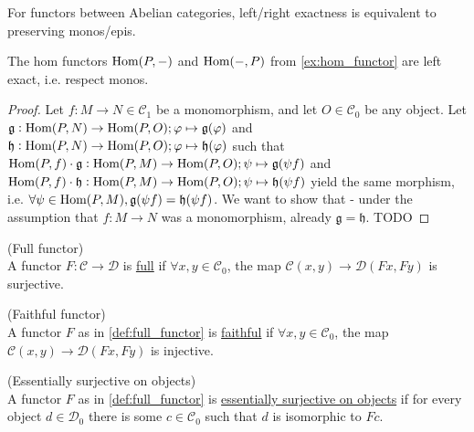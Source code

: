 \begin{lemma}
For functors between Abelian categories, left/right exactness is equivalent to preserving monos/epis.
\end{lemma}

\begin{lemma}\label{la:hom_functor_left_exact}
The hom functors $\textup{Hom}(P,-)$ and $\textup{Hom}(-,P)$ from \ref{ex:hom_functor} are left exact, i.e. respect monos.
\begin{proof}
Let $f : M \rightarrow N \in \mathcal{C}_{1}$ be a monomorphism, and let $O \in \mathcal{C}_{0}$ be any object.
Let $\mathfrak{g} : \textup{Hom}(P,N) \rightarrow \textup{Hom}(P,O); \varphi \mapsto \mathfrak{g}(\varphi)$
and $\mathfrak{h} : \textup{Hom}(P,N) \rightarrow \textup{Hom}(P,O); \varphi \mapsto \mathfrak{h}(\varphi)$
such that $\textup{Hom}(P,f) \cdot \mathfrak{g} : \textup{Hom}(P,M) \rightarrow \textup{Hom}(P,O); \psi \mapsto \mathfrak{g}(\psi f)$
and  $\textup{Hom}(P,f) \cdot \mathfrak{h} : \textup{Hom}(P,M) \rightarrow \textup{Hom}(P,O); \psi \mapsto \mathfrak{h}(\psi f)$
yield the same morphism, i.e. $\forall \psi \in \textup{Hom}(P,M), \mathfrak{g}(\psi f) = \mathfrak{h}(\psi f)$.
We want to show that - under the assumption that $f : M \rightarrow N$ was a monomorphism, already $\mathfrak{g} = \mathfrak{h}$.
TODO
\end{proof}
\end{lemma}

\begin{definition}{(Full functor)}\label{def:full_functor}\\
A functor $F : \mathcal{C} \rightarrow \mathcal{D}$ is \ul{full} if
$\forall x, y \in \mathcal{C}_{0}$, the map $\mathcal{C}(x, y) \rightarrow \mathcal{D}(Fx, Fy)$ is surjective.
\end{definition}

\begin{definition}{(Faithful functor)}\label{def:faithful_functor}\\
A functor $F$ as in \ref{def:full_functor} is \ul{faithful} if
$\forall x, y \in \mathcal{C}_{0}$, the map $\mathcal{C}(x, y) \rightarrow \mathcal{D}(Fx, Fy)$ is injective.
\end{definition}

\begin{definition}{(Essentially surjective on objects)}\label{def:ess_surj_o_o}\\
A functor $F$ as in \ref{def:full_functor} is \ul{essentially surjective on objects} if for every object $d \in \mathcal{D}_{0}$ there
is some $c \in \mathcal{C}_{0}$ such that $d$ is isomorphic to $Fc$.
\end{definition}

